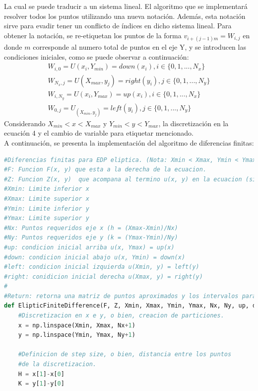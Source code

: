 \documentclass[letterpaper]{article}
\newcommand{\5}
{
\\[.5cm]
}
\begin{document}
\begin{itemize}
    La cual se puede traducir a un sistema lineal. El algoritmo que se implementará resolver todos los puntos utilizando una nueva notación. Además, esta notación sirve para evadir tener un conflicto de índices en dicho sistema lineal. Para obtener la notación, se re-etiquetan los puntos de la forma $v_{i + (j-1)m} = W_{i, j}$ en donde $m$ corresponde al numero total de puntos en el eje Y, y se introducen las condiciones iniciales, como se puede observar a continuación:
    \begin{equation}
    \begin{split}
    W_{i,0} = U(x_i, Y_{min}) = down(x_i), i \in \{0,1,...,N_x\} \\
    W_{N_x,j} = U(X_{max}, y_j) = right(y_i), j \in \{0,1,...,N_y\} \\
    W_{i,N_y} = U(x_i, Y_{max}) = up(x_i), i \in \{0,1,...,N_x\} \\
    W_{0,j} = U_(X_{min}, y_j) = left(y_i), j \in \{0,1,...,N_y\}
    \end{split}
	\end{equation}
    Considerando $X_{min} < x < X_{max}$ y $Y_{min} < y < Y_{max}$, la discretización en la ecuación 4 y el cambio de variable para etiquetar mencionado. \\[0.2cm]
    
    A continuación, se presenta la implementación del algoritmo de diferencias finitas:
    
    
\begin{lstlisting}[language=Python]
#Diferencias finitas para EDP eliptica. (Nota: Xmin < Xmax, Ymin < Ymax)
#F: Funcion F(x, y) que esta a la derecha de la ecuacion.
#Z: Funcion Z(x, y)  que acompana al termino u(x, y) en la ecuacion (si es de helmholtz)
#Xmin: Limite inferior x
#Xmax: Limite superior x
#Ymin: Limite inferior y
#Ymax: Limite superior y
#Nx: Puntos requeridos eje x (h = (Xmax-Xmin)/Nx)
#Ny: Puntos requeridos eje y (k = (Ymax-Ymin)/Ny)
#up: condicion inicial arriba u(x, Ymax) = up(x)
#down: condicion inicial abajo u(x, Ymin) = down(x)
#left: condicion inicial izquierda u(Xmin, y) = left(y)
#right: conidicion inicial derecha u(Xmax, y) = right(y)
#
#Return: retorna una matriz de puntos aproximados y los intervalos para los ejes X e Y
def ElipticFiniteDifference(F, Z, Xmin, Xmax, Ymin, Ymax, Nx, Ny, up, down, left, right):
	#Discretizacion en x e y, o bien, creacion de particiones.
	x = np.linspace(Xmin, Xmax, Nx+1)
	y = np.linspace(Ymin, Ymax, Ny+1)

	#Definicion de step size, o bien, distancia entre los puntos
	#de la discretizacion.
	H = x[1]-x[0]
	K = y[1]-y[0]


\end{lstlisting}
\end{itemize}
\end{document}
